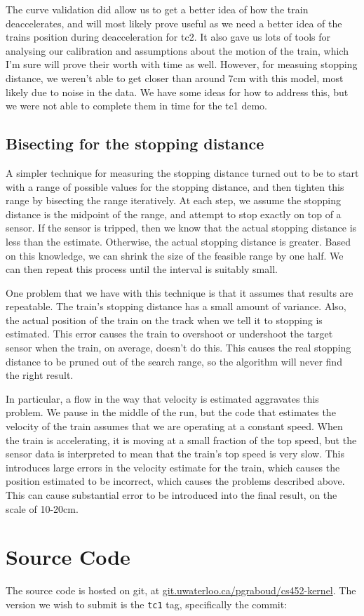 \documentclass[titlepage]{article}
\begin{document}
The curve validation did allow us to get a better idea of how the train
deaccelerates, and will most likely prove useful as we need a better idea
of the trains position during deacceleration for tc2. It also gave us lots
of tools for analysing our calibration and assumptions about the motion of
the train, which I'm sure will prove their worth with time as well. However,
for measuing stopping distance, we weren't able to get closer than around 7cm
with this model, most likely due to noise in the data. We have some ideas
for how to address this, but we were not able to complete them in time for
the tc1 demo.

\subsection{Bisecting for the stopping distance}
A simpler technique for measuring the stopping distance turned out to be to
start with a range of possible values for the stopping distance, and then
tighten this range by bisecting the range iteratively.
At each step, we assume the stopping distance is the midpoint of
the range, and attempt to stop exactly on top of a sensor.
If the sensor is tripped, then we know that the actual stopping distance
is less than the estimate.
Otherwise, the actual stopping distance is greater.
Based on this knowledge, we can shrink the size of the feasible range by
one half.
We can then repeat this process until the interval is suitably small.

One problem that we have with this technique is that it assumes that results
are repeatable.
The train's stopping distance has a small amount of variance.
Also, the actual position of the train on the track when we tell it to stopping
is estimated.
This error causes the train to overshoot or undershoot the target sensor when
the train, on average, doesn't do this.
This causes the real stopping distance to be pruned out of the search range, so
the algorithm will never find the right result.

In particular, a flow in the way that velocity is estimated aggravates this problem.
We pause in the middle of the run, but the code that estimates the velocity
of the train assumes that we are operating at a constant speed.
When the train is accelerating, it is moving at a small fraction of the top speed,
but the sensor data is interpreted to mean that the train's top speed is
very slow.
This introduces large errors in the velocity estimate for the train, which
causes the position estimated to be incorrect, which causes the problems described
above.
This can cause substantial error to be introduced into the final result, on
the scale of 10-20cm.

\section{Source Code}
The source code is hosted on git, at \url{git.uwaterloo.ca/pgraboud/cs452-kernel}.
The version we wish to submit is the \texttt{tc1} tag, specifically
the commit:

\end{document}
